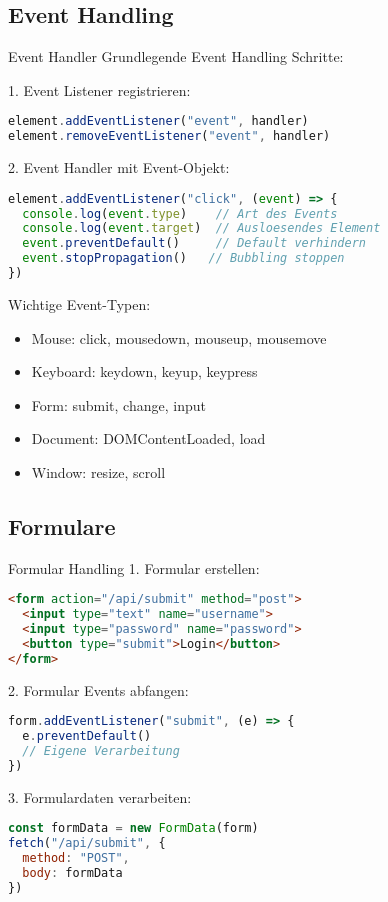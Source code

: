 \subsection{Event Handling}

\begin{KR}{Event Handler}
Grundlegende Event Handling Schritte:

1. Event Listener registrieren:
\begin{lstlisting}[language=JavaScript, style=basesmol]
element.addEventListener("event", handler)
element.removeEventListener("event", handler)
\end{lstlisting}

2. Event Handler mit Event-Objekt:
\begin{lstlisting}[language=JavaScript, style=basesmol]
element.addEventListener("click", (event) => {
  console.log(event.type)    // Art des Events
  console.log(event.target)  // Ausloesendes Element
  event.preventDefault()     // Default verhindern
  event.stopPropagation()   // Bubbling stoppen
})
\end{lstlisting}

Wichtige Event-Typen:
\begin{itemize}
  \item Mouse: click, mousedown, mouseup, mousemove
  \item Keyboard: keydown, keyup, keypress
  \item Form: submit, change, input
  \item Document: DOMContentLoaded, load
  \item Window: resize, scroll
\end{itemize}
\end{KR}

\subsection{Formulare}

\begin{KR}{Formular Handling}
1. Formular erstellen:
\begin{lstlisting}[language=HTML, style=basesmol]
<form action="/api/submit" method="post">
  <input type="text" name="username">
  <input type="password" name="password">
  <button type="submit">Login</button>
</form>
\end{lstlisting}

2. Formular Events abfangen:
\begin{lstlisting}[language=JavaScript, style=basesmol]
form.addEventListener("submit", (e) => {
  e.preventDefault() 
  // Eigene Verarbeitung
})
\end{lstlisting}

3. Formulardaten verarbeiten:
\begin{lstlisting}[language=JavaScript, style=basesmol]
const formData = new FormData(form)
fetch("/api/submit", {
  method: "POST",
  body: formData
})
\end{lstlisting}
\end{KR}

